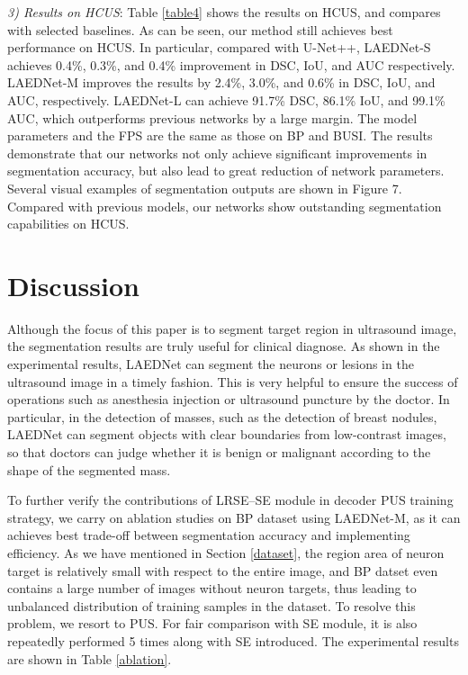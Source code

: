 \documentclass[review]{elsarticle}
\begin{document}
\emph{3) Results on HCUS}: Table \ref{table4} shows the results on HCUS\cite{2018Automated}, and compares with selected baselines. As can be seen, our method still achieves best performance on HCUS\cite{2018Automated}. In particular, compared with U-Net++\cite{2020UNet}, LAEDNet-S achieves 0.4\%, 0.3\%, and 0.4\% improvement in DSC, IoU, and AUC respectively. LAEDNet-M improves the results by 2.4\%, 3.0\%, and 0.6\% in DSC, IoU, and AUC, respectively. LAEDNet-L can achieve 91.7\% DSC, 86.1\% IoU, and 99.1\% AUC, which outperforms previous networks by a large margin. The model parameters and the FPS are the same as those on BP\cite{Kaggle} and BUSI\cite{2019Dataset}. The results demonstrate that our networks not only achieve significant improvements in segmentation accuracy, but also lead to great reduction of network parameters. Several visual examples of segmentation outputs are shown in Figure 7. Compared with previous models, our networks show outstanding segmentation capabilities on HCUS\cite{2018Automated}.

\section{Discussion}

Although the focus of this paper is to segment target region in ultrasound image, the segmentation results are truly useful for clinical diagnose. As shown in the experimental results, LAEDNet can segment the neurons or lesions in the ultrasound image in a timely fashion. This is very helpful to ensure the success of operations such as anesthesia injection or ultrasound puncture by the doctor. In particular, in the detection of masses, such as the detection of breast nodules, LAEDNet can segment objects with clear boundaries from low-contrast images, so that doctors can judge whether it is benign or malignant according to the shape of the segmented mass.

To further verify the contributions of LRSE--SE module in decoder PUS training strategy, we carry on ablation studies on BP\cite{Kaggle} dataset using LAEDNet-M, as it can achieves best trade-off between segmentation accuracy and implementing efficiency. As we have mentioned in Section \ref{dataset}, the region area of neuron target is relatively small with respect to the entire image, and BP datset even contains a large number of images without neuron targets, thus leading to unbalanced distribution of training samples in the dataset. To resolve this problem, we resort to PUS. For fair comparison with SE module, it is also repeatedly performed 5 times along with SE introduced. The experimental results are shown in Table \ref{ablation}.
\end{document}
